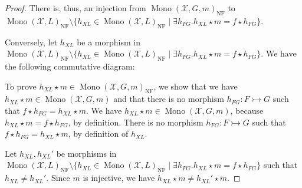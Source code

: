 \begin{proof}
    There is, thus, an injection from $\operatorname{Mono}(\mathcal{X},G,m)_{\operatorname{NF}}$ to $\operatorname{Mono}(\mathcal{X},L)_{\operatorname{NF}} \mathop{\setminus} \{
                h_{XL} \mathop{\in} \operatorname{Mono}(\mathcal{X},L)_{\operatorname{NF}} \mid 
                \exists h_{FG}. h_{XL} \mathop{\star} m \mathop{=} f \mathop{\star} h_{FG}
            \}$.

    Conversely, let $h_{XL}$ be a morphism in $\operatorname{Mono}(\mathcal{X},L)_{\operatorname{NF}}\mathop{\setminus} \{
                h_{XL} \mathop{\in} \operatorname{Mono}(\mathcal{X},L)_{\operatorname{NF}} \mid 
                \exists h_{FG}. h_{XL} \mathop{\star} m \mathop{=} f \mathop{\star} h_{FG}
            \}$. 
    We have the following commutative diagram:
    
    \begin{center}
    \end{center}
    To prove $h_{XL} \mathop{\star} m \mathop{\in} \operatorname{Mono}(\mathcal{X},G,m)_{\operatorname{NF}}$, we show that we have $h_{XL} \mathop{\star} m \mathop{\in} \operatorname{Mono}(\mathcal{X},G,m)$ and that there is no morphism $h_{FG}: F \rightarrowtail G$ such that $f \mathop{\star} h_{FG} \mathop{=} h_{XL} \mathop{\star} m$. We have $h_{XL} \mathop{\star} m \mathop{\in} \operatorname{Mono}(\mathcal{X},G,m)$, because $h_{XL} \mathop{\star} m \mathop{=} f \mathop{\star} h_{FG}$, by definition. There is no morphism $h_{FG}: F \rightarrowtail G$ such that $f \mathop{\star} h_{FG} \mathop{=} h_{XL} \mathop{\star} m$, by definition of $h_{XL}$.

    Let $h_{XL}, h_{XL}'$ be morphisms in $\operatorname{Mono}(\mathcal{X},L)_{\operatorname{NF}}\mathop{\setminus} \{
                h_{XL} \mathop{\in} \operatorname{Mono}(\mathcal{X},L)_{\operatorname{NF}} \mid 
                \exists h_{FG}. h_{XL} \mathop{\star} m \mathop{=} f \mathop{\star} h_{FG}
            \}$ such that $h_{XL} \mathop{\neq} h_{XL}'$.
    Since $m$ is injective, we have $h_{XL} \mathop{\star} m \mathop{\neq} h_{XL}' \mathop{\star} m$. 


\end{proof}

